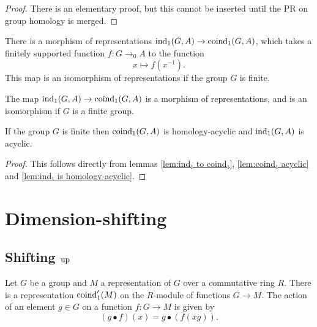 \begin{proof}
	There is an elementary proof, but this cannot be inserted until
	the PR on group homology is merged.
\end{proof}

\begin{definition}
	\label{def:ind₁ to coind₁}
	\leanok
	There is a morphism of representations $\mathrm{ind}_1(G,A) \to \mathrm{coind}_1(G,A)$,
	which takes a finitely supported function $f : G \to_0 A$ to the function
	\[
		x \mapsto f(x^{-1}).
	\]
	This map is an isomorphism of representations if the group $G$ is finite.
\end{definition}

\begin{lemma}
	\label{lem:ind₁ to coind₁}
	\leanok
	The map $\mathrm{ind}_1(G,A) \to \mathrm{coind}_1(G,A)$ is a morphism of representations,
	and is an isomorphism if $G$ is a finite group.
\end{lemma}


\begin{corollary}
	\label{cor:ind₁ is acyclic}
	If the group $G$ is finite then $\mathrm{coind}_1(G,A)$ is homology-acyclic
	and $\mathrm{ind}_1(G,A)$ is acyclic.
\end{corollary}

\begin{proof}
	This follows directly from lemmas \ref{lem:ind₁ to coind₁},	\ref{lem:coind₁ acyclic}
		and \ref{lem:ind₁ is homology-acyclic}.
	\leanok
\end{proof}


\section{Dimension-shifting}

\subsection{Shifting $\mathrm{up}$}

\begin{definition}
	\label{def:coind₁'}
	Let $G$ be a group and $M$ a representation of $G$ over a commutative ring $R$.
	There is a representation $\mathrm{coind}_1' (M)$ on the $R$-module of
	functions $G \to M$.
	The action of an element $g \in G$ on a function $f : G \to M$ is given by
	\[
		(g \bullet f)(x) = g \bullet (f (xg)).
	\]
\end{definition}

